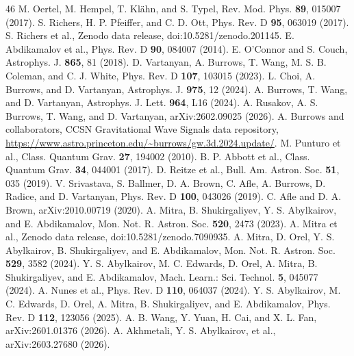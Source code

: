 \documentclass[reprint,aps,prd,floatfix,nofootinbib,superscriptaddress,showpacs]{revtex4-2}
\begin{document}
\begin{thebibliography}{46}
 M. Oertel, M. Hempel, T. Kl\"ahn, and S. Typel, Rev. Mod. Phys. \textbf{89}, 015007 (2017).
 S. Richers, H. P. Pfeiffer, and C. D. Ott, Phys. Rev. D \textbf{95}, 063019 (2017).
 S. Richers et al., Zenodo data release, doi:10.5281/zenodo.201145.
 E. Abdikamalov et al., Phys. Rev. D \textbf{90}, 084007 (2014).
 E. O'Connor and S. Couch, Astrophys. J. \textbf{865}, 81 (2018).
 D. Vartanyan, A. Burrows, T. Wang, M. S. B. Coleman, and C. J. White, Phys. Rev. D \textbf{107}, 103015 (2023).
 L. Choi, A. Burrows, and D. Vartanyan, Astrophys. J. \textbf{975}, 12 (2024).
 A. Burrows, T. Wang, and D. Vartanyan, Astrophys. J. Lett. \textbf{964}, L16 (2024).
 A. Rusakov, A. S. Burrows, T. Wang, and D. Vartanyan, arXiv:2602.09025 (2026).
 A. Burrows and collaborators, CCSN Gravitational Wave Signals data repository, \url{https://www.astro.princeton.edu/~burrows/gw.3d.2024.update/}.
 M. Punturo et al., Class. Quantum Grav. \textbf{27}, 194002 (2010).
 B. P. Abbott et al., Class. Quantum Grav. \textbf{34}, 044001 (2017).
 D. Reitze et al., Bull. Am. Astron. Soc. \textbf{51}, 035 (2019).
 V. Srivastava, S. Ballmer, D. A. Brown, C. Afle, A. Burrows, D. Radice, and D. Vartanyan, Phys. Rev. D \textbf{100}, 043026 (2019).
 C. Afle and D. A. Brown, arXiv:2010.00719 (2020).
 A. Mitra, B. Shukirgaliyev, Y. S. Abylkairov, and E. Abdikamalov, Mon. Not. R. Astron. Soc. \textbf{520}, 2473 (2023).
 A. Mitra et al., Zenodo data release, doi:10.5281/zenodo.7090935.
 A. Mitra, D. Orel, Y. S. Abylkairov, B. Shukirgaliyev, and E. Abdikamalov, Mon. Not. R. Astron. Soc. \textbf{529}, 3582 (2024).
 Y. S. Abylkairov, M. C. Edwards, D. Orel, A. Mitra, B. Shukirgaliyev, and E. Abdikamalov, Mach. Learn.: Sci. Technol. \textbf{5}, 045077 (2024).
 A. Nunes et al., Phys. Rev. D \textbf{110}, 064037 (2024).
 Y. S. Abylkairov, M. C. Edwards, D. Orel, A. Mitra, B. Shukirgaliyev, and E. Abdikamalov, Phys. Rev. D \textbf{112}, 123056 (2025).
 A. B. Wang, Y. Yuan, H. Cai, and X. L. Fan, arXiv:2601.01376 (2026).
 A. Akhmetali, Y. S. Abylkairov, et al., arXiv:2603.27680 (2026).

\end{thebibliography}
\end{document}
